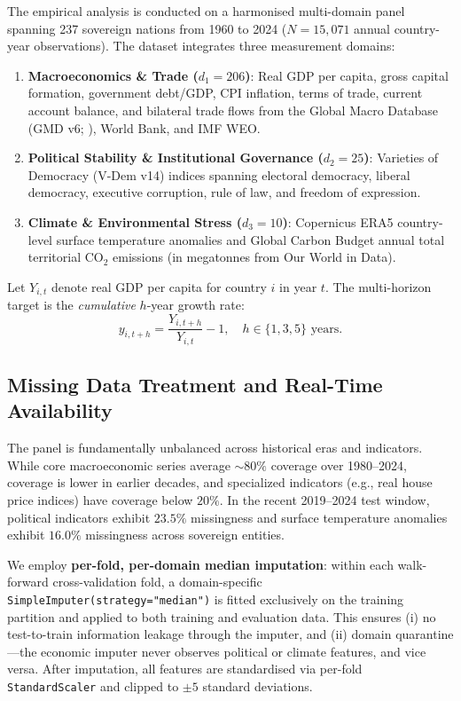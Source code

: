 \documentclass[11pt,a4paper]{article}
\begin{document}
The empirical analysis is conducted on a harmonised multi-domain panel spanning 237 sovereign nations from 1960 to 2024 ($N = 15{,}071$ annual country-year observations). The dataset integrates three measurement domains:
\begin{enumerate}[leftmargin=*, label=\arabic*.]
    \item \textbf{Macroeconomics \& Trade ($d_1 = 206$)}: Real GDP per capita, gross capital formation, government debt/GDP, CPI inflation, terms of trade, current account balance, and bilateral trade flows from the Global Macro Database (GMD v6; \citealt{muller2025gmd}), World Bank, and IMF WEO.
    \item \textbf{Political Stability \& Institutional Governance ($d_2 = 25$)}: Varieties of Democracy (V-Dem v14) indices spanning electoral democracy, liberal democracy, executive corruption, rule of law, and freedom of expression.
    \item \textbf{Climate \& Environmental Stress ($d_3 = 10$)}: Copernicus ERA5 country-level surface temperature anomalies and Global Carbon Budget annual total territorial $\text{CO}_2$ emissions (in megatonnes from Our World in Data).
\end{enumerate}

Let $Y_{i,t}$ denote real GDP per capita for country $i$ in year $t$. The multi-horizon target is the \emph{cumulative} $h$-year growth rate:
\begin{equation}
y_{i, t+h} = \frac{Y_{i, t+h}}{Y_{i,t}} - 1, \quad h \in \{1, 3, 5\} \text{ years}.
\end{equation}

\subsection{Missing Data Treatment and Real-Time Availability}
\label{sec:imputation}

The panel is fundamentally unbalanced across historical eras and indicators. While core macroeconomic series average ${\sim}80\%$ coverage over 1980--2024, coverage is lower in earlier decades, and specialized indicators (e.g., real house price indices) have coverage below $20\%$. In the recent 2019--2024 test window, political indicators exhibit $23.5\%$ missingness and surface temperature anomalies exhibit $16.0\%$ missingness across sovereign entities.

We employ \textbf{per-fold, per-domain median imputation}: within each walk-forward cross-validation fold, a domain-specific \texttt{SimpleImputer(strategy="median")} is fitted exclusively on the training partition and applied to both training and evaluation data. This ensures (i) no test-to-train information leakage through the imputer, and (ii) domain quarantine---the economic imputer never observes political or climate features, and vice versa. After imputation, all features are standardised via per-fold \texttt{StandardScaler} and clipped to $\pm 5$ standard deviations.
\end{document}
